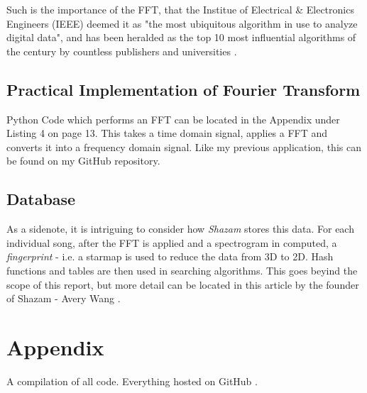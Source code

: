 \documentclass[a4paper,12pt]{article}
\begin{document}
Such is the importance of the FFT, that the Institue of Electrical \& Electronics Engineers (IEEE)  deemed it as "the most ubiquitous algorithm
in use to analyze digital data", and has been heralded as the top 10 most
influential algorithms of the century by countless publishers and universities \parencite{AlgorithmQuoteft}.

\subsection{Practical Implementation of Fourier Transform}
\label{FTimplementation}

Python Code which performs an FFT can be located in the Appendix under Listing 4 on page 13. This takes a time domain signal, applies a FFT and converts it into a frequency domain signal. Like my previous application, this can be found on my GitHub repository.

\subsection{Database}
As a sidenote, it is intriguing to consider how \textit{Shazam} stores this data. For each individual song, after the FFT is applied and a spectrogram in computed, a \textit{fingerprint} - i.e. a starmap is used to reduce the data
from 3D to 2D. Hash functions and tables are then used in searching algorithms. This goes beyind the scope of this report, but more detail can be located in this article by the founder of Shazam - Avery Wang \parencite{AveryWang}.

\newpage
\section{Appendix}
\label{Appendix}
A compilation of all code. Everything hosted on GitHub \parencite{GitHubRepo}.

%



\end{document}
